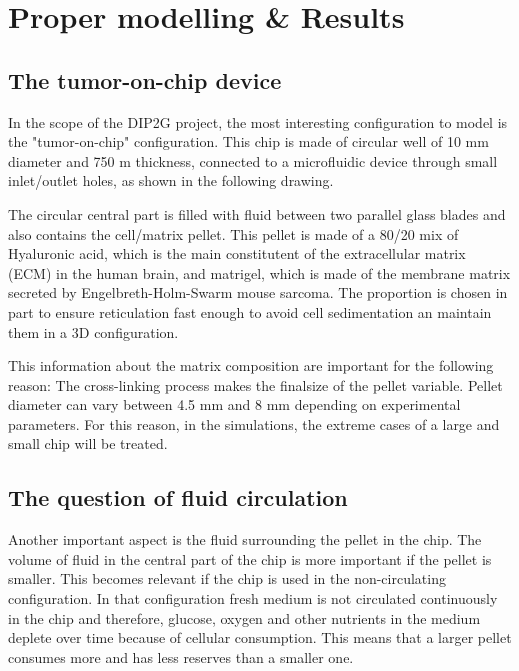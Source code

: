 \documentclass[11pt,a4paper]{article}
\begin{document}
\section{Proper modelling \& Results}
\subsection{The tumor-on-chip device}
In the scope of the DIP2G project, the most interesting configuration to model is the "tumor-on-chip" configuration. This chip is made of circular well of 10 mm diameter and 750 \textmu m thickness, connected to a microfluidic device through small inlet/outlet holes, as shown in the following drawing.

\vspace{1cm}
\hspace{2cm}

The circular central part is filled with fluid between two parallel glass blades and also contains the cell/matrix pellet. This pellet is made of a 80/20 mix of Hyaluronic acid, which is the main constitutent of the extracellular matrix (ECM) in the human brain, and matrigel, which is made of the membrane matrix secreted by Engelbreth-Holm-Swarm mouse sarcoma. The proportion is chosen in part to ensure reticulation fast enough to avoid cell sedimentation an maintain them in a 3D configuration.

This information about the matrix composition are important for the following reason: The cross-linking process makes the finalsize of the pellet   variable. Pellet diameter can vary between 4.5 mm and 8 mm depending on experimental parameters. For this reason, in the simulations, the extreme cases of a large and small chip will be treated.

\subsection{The question of fluid circulation}
Another important aspect is the fluid surrounding the pellet in the chip. The volume of fluid in the central part of the chip is more important if the pellet is smaller. This becomes relevant if the chip is used in the non-circulating configuration. In that configuration fresh medium is not circulated continuously in the chip and therefore, glucose, oxygen and other nutrients in the medium deplete over time because of cellular consumption. This means that a larger pellet consumes more and has less reserves than a smaller one.
\end{document}
